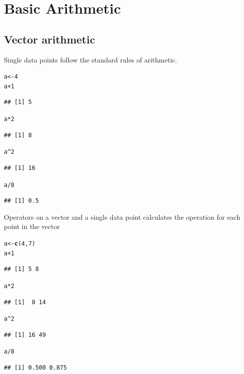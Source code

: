 \documentclass{article}\usepackage[]{graphicx}\usepackage[]{color}
\makeatletter
\newcommand{\hlnum}[1]{\textcolor[rgb]{0.686,0.059,0.569}{#1}}%
\newcommand{\hlopt}[1]{\textcolor[rgb]{0,0,0}{#1}}%
\newcommand{\hlstd}[1]{\textcolor[rgb]{0.345,0.345,0.345}{#1}}%
\newcommand{\hlkwb}[1]{\textcolor[rgb]{0.69,0.353,0.396}{#1}}%
\newcommand{\hlkwd}[1]{\textcolor[rgb]{0.737,0.353,0.396}{\textbf{#1}}}%
\newenvironment{kframe}{%
 \def\at@end@of@kframe{}%
 \ifinner\ifhmode%
  \def\at@end@of@kframe{\end{minipage}}%
  \begin{minipage}{\columnwidth}%
 \fi\fi%
 \def\FrameCommand##1{\hskip\@totalleftmargin \hskip-\fboxsep
 \colorbox{shadecolor}{##1}\hskip-\fboxsep
     \hskip-\linewidth \hskip-\@totalleftmargin \hskip\columnwidth}%
 \MakeFramed {\advance\hsize-\width
   \@totalleftmargin\z@ \linewidth\hsize
   \@setminipage}}%
 {\par\unskip\endMakeFramed%
 \at@end@of@kframe}
\newenvironment{knitrout}{}{} %
\makeatother
\begin{document}
\section{Basic Arithmetic}
\subsection{Vector arithmetic}
Single data points follow the standard rules of arithmetic.
\begin{knitrout}
\color{fgcolor}\begin{kframe}
\begin{alltt}
\hlstd{a} \hlkwb{<-} \hlnum{4}
\hlstd{a} \hlopt{+} \hlnum{1}
\end{alltt}
\begin{verbatim}
## [1] 5
\end{verbatim}
\begin{alltt}
\hlstd{a} \hlopt{*} \hlnum{2}
\end{alltt}
\begin{verbatim}
## [1] 8
\end{verbatim}
\begin{alltt}
\hlstd{a} \hlopt{^} \hlnum{2}
\end{alltt}
\begin{verbatim}
## [1] 16
\end{verbatim}
\begin{alltt}
\hlstd{a} \hlopt{/} \hlnum{8}
\end{alltt}
\begin{verbatim}
## [1] 0.5
\end{verbatim}
\end{kframe}
\end{knitrout}
Operators on a vector and a single data point calculates the operation for each point in the vector
\begin{knitrout}
\color{fgcolor}\begin{kframe}
\begin{alltt}
\hlstd{a} \hlkwb{<-} \hlkwd{c}\hlstd{(}\hlnum{4}\hlstd{,} \hlnum{7}\hlstd{)}
\hlstd{a} \hlopt{+} \hlnum{1}
\end{alltt}
\begin{verbatim}
## [1] 5 8
\end{verbatim}
\begin{alltt}
\hlstd{a} \hlopt{*} \hlnum{2}
\end{alltt}
\begin{verbatim}
## [1]  8 14
\end{verbatim}
\begin{alltt}
\hlstd{a} \hlopt{^} \hlnum{2}
\end{alltt}
\begin{verbatim}
## [1] 16 49
\end{verbatim}
\begin{alltt}
\hlstd{a} \hlopt{/} \hlnum{8}
\end{alltt}
\begin{verbatim}
## [1] 0.500 0.875
\end{verbatim}
\end{kframe}
\end{knitrout}
\end{document}
